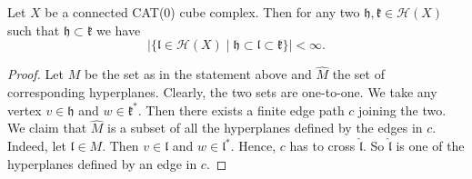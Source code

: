 \begin{lemma}
  \label{lem:finite-interval}
  Let \(X\) be a connected CAT(0) cube complex. Then for any two \(\mathfrak{h,k} \in \mathcal{H}(X)\) such that \(\mathfrak{h} \subset \mathfrak{k}\) we have
  \[
    |\{\mathfrak{l} \in \mathcal{H}(X) \mid \mathfrak{h} \subset \mathfrak{l} \subset \mathfrak{k}\}| < \infty.
  \]
\end{lemma}

\begin{proof}
  Let \(M\) be the set as in the statement above and \(\hat M\) the set of corresponding hyperplanes. Clearly, the two sets are one-to-one. We take any vertex \(v \in \mathfrak{h}\)  and \(w \in \mathfrak{k}^\ast\). Then there exists a finite edge path \(c\) joining the two. We claim that \(\hat M\) is a subset of all the hyperplanes defined by the edges in \(c\). Indeed, let \(\mathfrak{l} \in M\). Then \(v \in \mathfrak{l}\) and \(w \in \mathfrak{l}^\ast\). Hence, \(c\) has to cross \(\mathfrak{\hat l}\). So \(\mathfrak{\hat l}\) is one of the hyperplanes defined by an edge in \(c\).
\end{proof}

